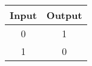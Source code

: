 
\begin{tabular}{ |c|c| }
\hline
\rowcolor{gray!60}
Input & Output \\
\hline
0 & 1 \\
\hline
1 & 0 \\
\hline
\end{tabular}

